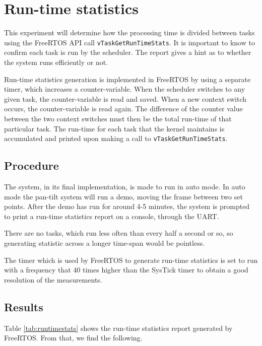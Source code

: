 \chapter{Run-time statistics}\label{sec:runtimestats}
This experiment will determine how the processing time is divided between tasks using the FreeRTOS API call \texttt{vTaskGetRunTimeStats}. It is important to know to confirm each task is run by the scheduler. The report gives a hint as to whether the system runs efficiently or not.

Run-time statistics generation is implemented in FreeRTOS by using a separate timer, which increases a counter-variable. When the scheduler switches to any given task, the counter-variable is read and saved. When a new context switch occurs, the counter-variable is read again. The difference of the counter value between the two context switches must then be the total run-time of that particular task. The run-time for each task that the kernel maintains is accumulated and printed upon making a call to \texttt{vTaskGetRunTimeStats}.


\section{Procedure}
The system, in its final implementation, is made to run in auto mode. In auto mode the pan-tilt system will run a demo, moving the frame between two set points. After the demo has run for around 4-5 minutes, the system is prompted to print a run-time statistics report on a console, through the UART.

There are no tasks, which run less often than every half a second or so, so generating statistic across a longer time-span would be pointless.

The timer which is used by FreeRTOS to generate run-time statistics is set to run with a frequency that 40 times higher than the SysTick timer to obtain a good resolution of the measurements.


\section{Results}
Table \ref{tab:runtimestats} shows the run-time statistics report generated by FreeRTOS. From that, we find the following.

